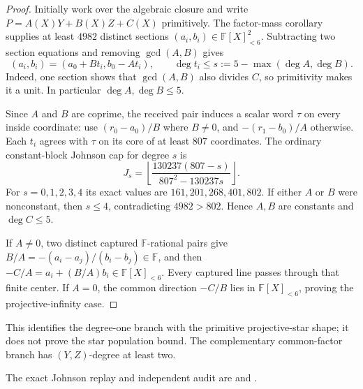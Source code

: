 \documentclass[11pt,a4paper]{amsart}
\numberwithin{equation}{section}
\theoremstyle{remark}
\newcommand{\F}{\mathbb F}\newcommand{\B}{\mathbb B}\newcommand{\K}{\mathbb K}\newcommand{\Z}{\mathbb Z}
\begin{document}
\begin{proof}
Initially work over the algebraic closure and write
$P=A(X)Y+B(X)Z+C(X)$ primitively.  The factor-mass corollary supplies at
least $4982$ distinct sections $(a_i,b_i)\in\F[X]_{<6}^2$.  Subtracting two
section equations and removing $\gcd(A,B)$ gives
\[
 (a_i,b_i)=(a_0+Bt_i,b_0-At_i),
 \qquad
 \deg t_i\le s:=5-\max(\deg A,\deg B).             \tag{LS2}
\]
Indeed, one section shows that $\gcd(A,B)$ also divides $C$, so primitivity
makes it a unit.  In particular $\deg A,\deg B\le5$.

Since $A$ and $B$ are coprime, the received pair induces a scalar word
$\tau$ on every inside coordinate: use
$(r_0-a_0)/B$ where $B\ne0$, and $-(r_1-b_0)/A$ otherwise.  Each $t_i$
agrees with $\tau$ on its core of at least $807$ coordinates.  The ordinary
constant-block Johnson cap for degree $s$ is
\[
 J_s=\left\lfloor
 \frac{130237(807-s)}{807^2-130237s}\right\rfloor.
\]
For $s=0,1,2,3,4$ its exact values are
$161,201,268,401,802$.  If either $A$ or $B$ were nonconstant, then
$s\le4$, contradicting $4982>802$.  Hence $A,B$ are constants and
$\deg C\le5$.

If $A\ne0$, two distinct captured $\F$-rational pairs give
$B/A=-(a_i-a_j)/(b_i-b_j)\in\F$, and then
$-C/A=a_i+(B/A)b_i\in\F[X]_{<6}$.  Every captured line passes through that
finite center.  If $A=0$, the common direction $-C/B$ lies in
$\F[X]_{<6}$, proving the projective-infinity case.
\end{proof}

\begin{remark}
This identifies the degree-one branch with the primitive projective-star
shape; it does not prove the star population bound.  The complementary
common-factor branch has $(Y,Z)$-degree at least two.

The exact Johnson replay and independent audit are
and
.
\end{remark}
\end{document}
